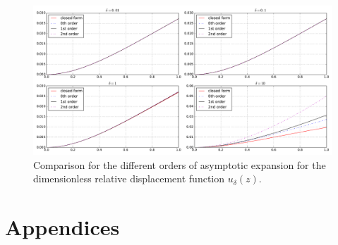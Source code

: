 \documentclass{article}
\begin{document}
\begin{figure}[!htbp]
    \centering
    \includegraphics[width=\textwidth]{./img_eig_asy/fig_sol_analytic_disp_cmp}
    \caption{Comparison for the different orders of asymptotic expansion for the dimensionless relative displacement function $u_\delta(z)$.}
    \label{fig:fig_sol_analytic_disp_cmp}
\end{figure}














































\section*{Appendices}
\end{document}
